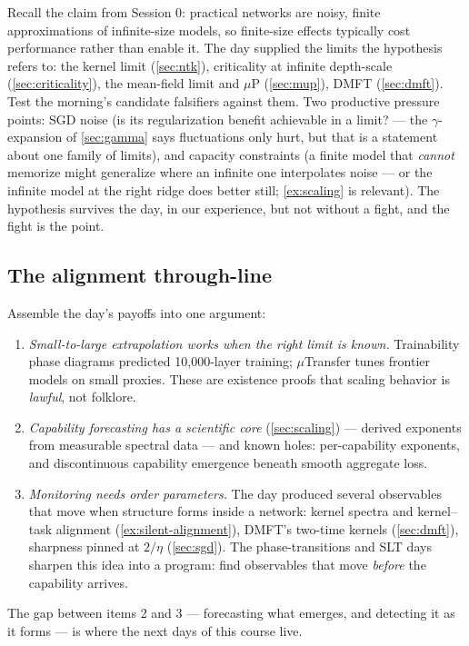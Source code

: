 \documentclass[11pt]{article}
\begin{document}
Recall the claim from Session 0: practical networks are noisy, finite
approximations of infinite-size models, so finite-size effects typically
cost performance rather than enable it. The day supplied the limits the
hypothesis refers to: the kernel limit (\cref{sec:ntk}), criticality at
infinite depth-scale (\cref{sec:criticality}), the mean-field limit and
$\mu$P (\cref{sec:mup}), DMFT (\cref{sec:dmft}). Test the morning's
candidate falsifiers against them. Two productive pressure points: SGD
noise (is its regularization benefit achievable in a limit? --- the
$\gamma$-expansion of \cref{sec:gamma} says fluctuations only hurt, but
that is a statement about one family of limits), and capacity constraints
(a finite model that \emph{cannot} memorize might generalize where an
infinite one interpolates noise --- or the infinite model at the right
ridge does better still; \cref{ex:scaling} is relevant). The hypothesis
survives the day, in our experience, but not without a fight, and the fight
is the point.

\subsection{The alignment through-line}

Assemble the day's payoffs into one argument:
\begin{enumerate}
  \item \emph{Small-to-large extrapolation works when the right limit is
  known.} Trainability phase diagrams predicted 10{,}000-layer training;
  $\mu$Transfer tunes frontier models on small proxies. These are
  existence proofs that scaling behavior is \emph{lawful}, not folklore.
  \item \emph{Capability forecasting has a scientific core}
  (\cref{sec:scaling}) --- derived exponents from measurable spectral data
  --- and known holes: per-capability exponents, and discontinuous
  capability emergence beneath smooth aggregate loss.
  \item \emph{Monitoring needs order parameters.} The day produced several
  observables that move when structure forms inside a network: kernel
  spectra and kernel--task alignment (\cref{ex:silent-alignment}), DMFT's
  two-time kernels (\cref{sec:dmft}), sharpness pinned at $2/\eta$
  (\cref{sec:sgd}). The phase-transitions and SLT days sharpen this idea
  into a program: find observables that move \emph{before} the capability
  arrives.
\end{enumerate}
The gap between items 2 and 3 --- forecasting what emerges, and detecting it
as it forms --- is where the next days of this course live.
\end{document}
